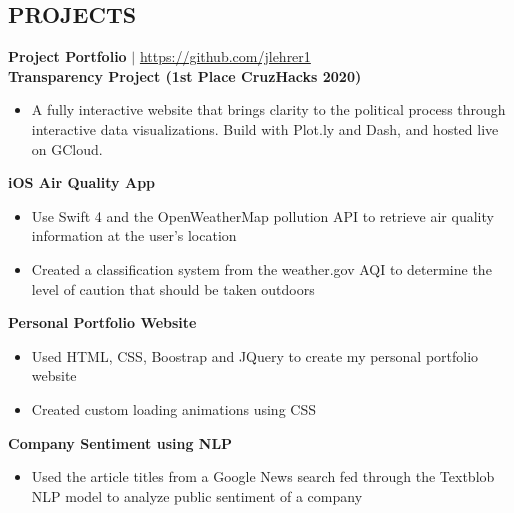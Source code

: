 \documentclass[margin]{res}
\begin{document}
\begin{resume}
\section{PROJECTS}
    \textbf{Project Portfolio} $\mid$ \textcolor{blue}{\href{https://github.com/jlehrer1}{https://github.com/jlehrer1}} \vspace {2mm} \\
    \textbf{Transparency Project (1st Place CruzHacks 2020)}
    \begin{itemize}
        \item A fully interactive website that brings clarity to the political process through interactive data visualizations. Build with Plot.ly and Dash, and hosted live on GCloud.
    \end{itemize}\vspace*{-8pt}
    \textbf{iOS Air Quality App}
    \begin{itemize}
        \item Use Swift 4 and the OpenWeatherMap pollution API to retrieve air quality information at the user's location
        \item Created a classification system from the weather.gov AQI to determine the level of caution that should be taken outdoors
    \end{itemize}\vspace*{-8pt}
	\textbf{Personal Portfolio Website}
	\begin{itemize}[]
	    \item Used HTML, CSS, Boostrap and JQuery to create my personal portfolio website
	    \item Created custom loading animations using CSS
	\end{itemize}\vspace*{-8pt}
    \textbf{Company Sentiment using NLP}
    \begin{itemize}
        \item Used the article titles from a Google News search fed through the Textblob NLP model to analyze public sentiment of a company
    \end{itemize}\vspace*{-8pt}


\end{resume}
\end{document}
